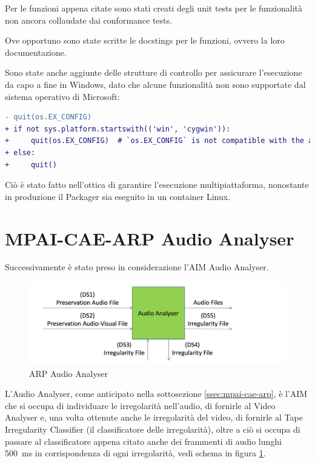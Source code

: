 Per le funzioni appena citate sono stati creati degli unit tests per le funzionalità non ancora collaudate dai conformance tests.

Ove opportuno sono state scritte le docstings per le funzioni, ovvero la loro documentazione.

Sono state anche aggiunte delle strutture di controllo per assicurare l'esecuzione da capo a fine in Windows, dato che alcune funzionalità non sono supportate dal sistema operativo di Microsoft:
\begin{lstlisting}[language=diff, caption=Modifiche per permettere la compatibilità di Packager con Windows]
- quit(os.EX_CONFIG)
+ if not sys.platform.startswith(('win', 'cygwin')):
+     quit(os.EX_CONFIG)  # `os.EX_CONFIG` is not compatible with the above platforms in Python 3.10
+ else:
+     quit()
\end{lstlisting}
Ciò è stato fatto nell'ottica di garantire l'esecuzione multipiattaforma, nonostante in produzione il Packager sia eseguito in un container Linux.


\section{MPAI-CAE-ARP Audio Analyser} \label{sec:test-audioanalyser}
Successivamente è stato preso in considerazione l'\ac{AIM} Audio Analyser.

\begin{figure}[H]
    \centering
    \includegraphics{img/audioanalyser.png}
    \caption{\ac{ARP} Audio Analyser}
    \label{fig:audio-analyser}
\end{figure}

L'Audio Analyser, come anticipato nella sottosezione \ref{ssec:mpai-cae-arp}, è l'\ac{AIM} che si occupa di individuare le irregolarità nell'audio, di fornirle al Video Analyser e, una volta ottenute anche le irregolarità del video, di fornirle al Tape Irregularity Classifier (il classificatore delle irregolarità), oltre a ciò si occupa di passare al classificatore appena citato anche dei frammenti di audio lunghi \qty{500}{\ms} in corrispondenza di ogni irregolarità, vedi schema in figura \ref{fig:audio-analyser}.

